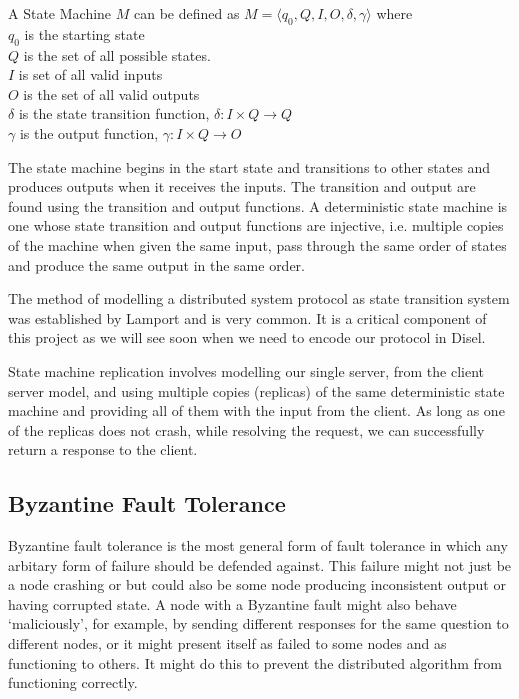 A State Machine $M$ can be defined as $M = \langle q_0, Q, I, O, \delta, \gamma \rangle$ where \\
$q_0$ is the starting state \\
$Q$ is the set of all possible states. \\
$I$ is set of all valid inputs \\
$O$ is the set of all valid outputs \\
$\delta$ is the state transition function, $\delta : I \times Q \rightarrow Q$ \\
$\gamma$ is the output function, $\gamma : I \times Q \rightarrow O$

The state machine begins in the start state and transitions to other states and
produces outputs when it receives the inputs. The transition and output are found
using the transition and output functions. A deterministic state machine is one
whose state transition and output functions are injective, i.e. multiple
copies of the machine when given the same input, pass through the same order of states
and produce the same output in the same order.

The method of modelling a distributed system protocol as state transition system
was established by Lamport \cite{10} and is very common. It is a critical component
of this project as we will see soon when we need to encode our protocol in Disel.

State machine replication involves modelling our single server, from the client
server model, and using multiple copies (replicas) of the same deterministic
state machine and providing all of them with the input from the client.
As long as one of the replicas does not crash, while resolving the request,
we can successfully return a response to the client.

\subsection{Byzantine Fault Tolerance}
Byzantine fault tolerance is the most general form of fault tolerance in which
any arbitary form of failure should be defended against. This failure might not
just be a node crashing or but could also be some node producing inconsistent
output or having corrupted state. A node with a Byzantine fault might also behave
`maliciously', for example, by sending different responses for the same question to
different nodes, or it might present itself as failed to some nodes and as functioning
to others. It might do this to prevent the distributed algorithm from functioning
correctly.

